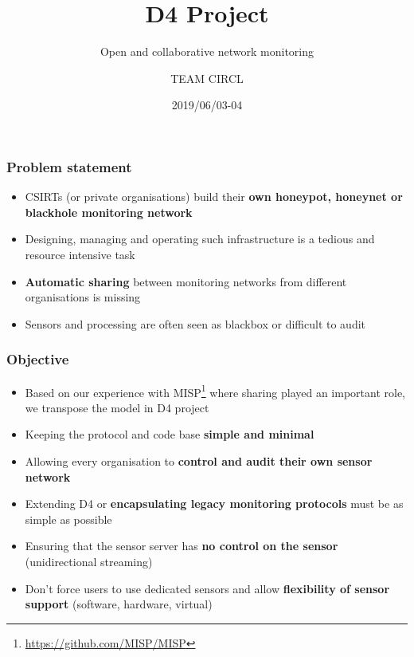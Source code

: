 \documentclass{beamer}
\title{D4 Project}
\subtitle{Open and collaborative network monitoring}
\author{TEAM CIRCL}
\institute{Team CIRCL \\ \url{https://www.d4-project.org/}}
\date{2019/06/03-04}
\begin{document}
    \begin{frame}
        \maketitle
    \end{frame}

\begin{frame}
        \frametitle{Problem statement}
        \begin{itemize}
                \item CSIRTs (or private organisations) build their {\bf own honeypot, honeynet or blackhole monitoring network}
                \item Designing, managing and operating such infrastructure is a tedious and resource intensive task
                \item {\bf Automatic sharing} between monitoring networks from different organisations is missing
                \item Sensors and processing are often seen as blackbox or difficult to audit

        \end{itemize}
\end{frame}


\begin{frame}
 \frametitle{Objective}
 \begin{itemize}
         \item Based on our experience with
           MISP\footnote{\url{https://github.com/MISP/MISP}} where sharing
           played an important role, we transpose the model in D4 project
         \item Keeping the protocol and code base {\bf simple and minimal}
         \item Allowing every organisation to {\bf control and audit their own sensor network}
         \item Extending D4 or {\bf encapsulating legacy monitoring protocols} must be as simple as possible
         \item Ensuring that the sensor server has {\bf no control on the sensor} (unidirectional streaming)
         \item Don't force users to use dedicated sensors and allow {\bf flexibility of sensor support} (software, hardware, virtual)

 \end{itemize}
\end{frame}
\end{document}
